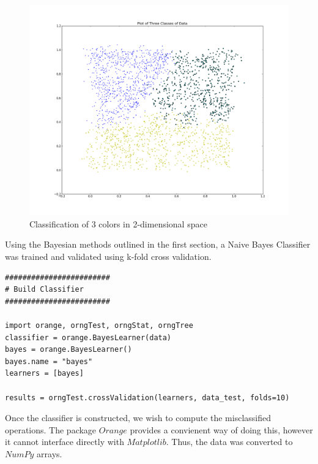 \begin{figure}[H]
    \centering
       \includegraphics[width=6.5 in]{3_groups.png}
    \caption{Classification of 3 colors in 2-dimensional space}
    \label{Example Data}
\end{figure}


\begin{flushleft}Using the Bayesian methods outlined in the first section, a Naive Bayes Classifier was trained and validated using k-fold cross validation.
\end{flushleft}

\begin{lstlisting}[caption={Construct the Classifier},label=2nd,firstnumber=103]
########################
# Build Classifier
########################

import orange, orngTest, orngStat, orngTree   
classifier = orange.BayesLearner(data)
bayes = orange.BayesLearner()
bayes.name = "bayes"
learners = [bayes]

results = orngTest.crossValidation(learners, data_test, folds=10)
\end{lstlisting}

\begin{flushleft}Once the classifier is constructed, we wish to compute the misclassified operations. The package $Orange$ provides a convienent way of doing this, however it cannot interface directly with $Matplotlib$. Thus, the data was converted to $NumPy$ arrays.
\end{flushleft}

